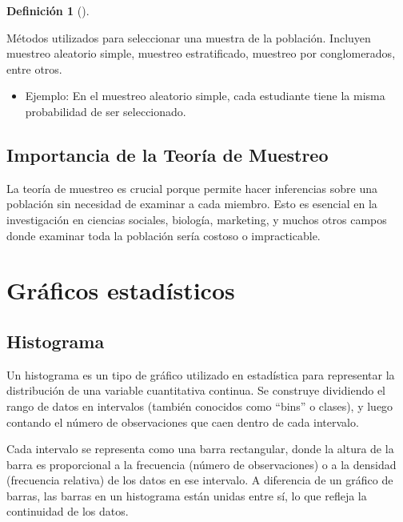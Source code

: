 \documentclass[
  us-letterpaper,
]{scrreprt}
\providecommand{\tightlist}{%
  \setlength{\itemsep}{0pt}\setlength{\parskip}{0pt}}\usepackage{longtable,booktabs,array}
\theoremstyle{plain}
\theoremstyle{plain}
\theoremstyle{definition}
\newtheorem{definition}{Definición}[chapter]
\theoremstyle{remark}
\begin{document}
\begin{definition}[]\protect\hypertarget{def-tecnicas_muestreo}{}\label{def-tecnicas_muestreo}

Métodos utilizados para seleccionar una muestra de la población.
Incluyen muestreo aleatorio simple, muestreo estratificado, muestreo por
conglomerados, entre otros.

\end{definition}

\begin{itemize}
\tightlist
\item
  Ejemplo: En el muestreo aleatorio simple, cada estudiante tiene la
  misma probabilidad de ser seleccionado.
\end{itemize}

\subsection{Importancia de la Teoría de
Muestreo}\label{importancia-de-la-teoruxeda-de-muestreo}

La teoría de muestreo es crucial porque permite hacer inferencias sobre
una población sin necesidad de examinar a cada miembro. Esto es esencial
en la investigación en ciencias sociales, biología, marketing, y muchos
otros campos donde examinar toda la población sería costoso o
impracticable.

\section{Gráficos estadísticos}\label{gruxe1ficos-estaduxedsticos}

\subsection{Histograma}\label{sec-histogramas}

Un histograma es un tipo de gráfico utilizado en estadística para
representar la distribución de una variable cuantitativa continua. Se
construye dividiendo el rango de datos en intervalos (también conocidos
como ``bins'' o clases), y luego contando el número de observaciones que
caen dentro de cada intervalo.

Cada intervalo se representa como una barra rectangular, donde la altura
de la barra es proporcional a la frecuencia (número de observaciones) o
a la densidad (frecuencia relativa) de los datos en ese intervalo. A
diferencia de un gráfico de barras, las barras en un histograma están
unidas entre sí, lo que refleja la continuidad de los datos.
\end{document}
